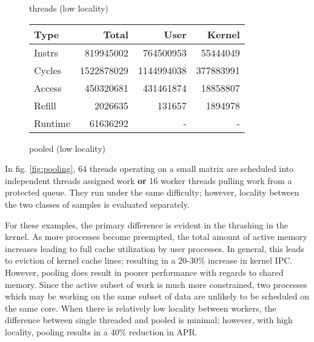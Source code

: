 \documentclass[11pt]{article}
\begin{document}
\begin{figure*}[!h]
\begin{subtable}{.48\textwidth}
		\caption{threads (low locality)}
	\end{subtable}
	\hfill
	\begin{subtable}{.48\textwidth} 
		\centering
		\begin{tabular}{ l|rrr }
			Type    & Total      & User       & Kernel    \\
			\hline
			Instrs & 819945002 & 764500953 & 55444049 \\ 
			Cycles & 1522878029 & 1144994038 & 377883991 \\ 
			Access & 450320681 & 431461874 & 18858807 \\ 
			Refill & 2026635 & 131657 & 1894978 \\ 
			Runtime & 61636292 & - & - \\
			\hline
		\end{tabular}
		\caption{pooled (low locality)}
		\label{fig:test}
	\end{subtable}
\end{figure*}

In fig. \ref{fig:pooling}, 64 threads operating on a small matrix are scheduled into independent threads assigned work \textbf{or} 16 worker threads pulling work from a protected queue.  They run under the same difficulty; however, locality between the two classes of samples is evaluated separately.

For these examples, the primary difference is evident in the thrashing in the kernel.  As more processes become preempted, the total amount of active memory increases leading to full cache utilization by user processes.  In general, this leads to eviction of kernel cache lines; resulting in a 20-30\% increase in kernel IPC.  However, pooling does result in poorer performance with regards to shared memory.  Since the active subset of work is much more constrained, two processes which may be working on the same subset of data are unlikely to be scheduled on the same core.  When there is relatively low locality between workers, the difference between single threaded and pooled is minimal; however, with high locality, pooling results in a 40\% reduction in APR.
\end{document}
